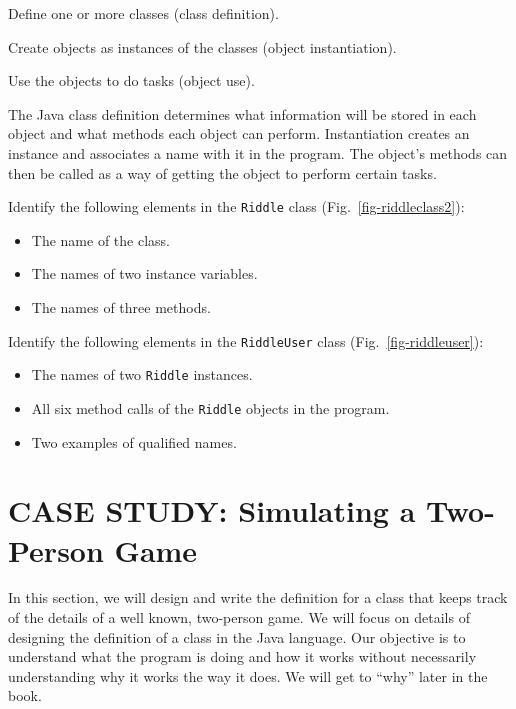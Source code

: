\begin{BL}
\item  Define one or more classes (class definition).
\item  Create objects as instances of the classes (object instantiation).
\item  Use the objects to do tasks (object use).
\end{BL}

\noindent The Java class definition determines what
information will be stored in each object and what methods each object
can perform.  Instantiation creates an instance and associates a name
with it in the program.  The object's methods can then be called as a
way of getting the object to perform certain tasks.

\pagebreak
{}
\begin{SSTUDY}

\item
Identify the following elements in the {\tt Riddle} class
(Fig.~\ref{fig-riddleclass2}):

\begin{itemize}
\item  The name of the class.
\item  The names of two instance variables.
\item  The names of three methods.
\end{itemize}


\item
Identify the following elements in the {\tt RiddleUser} class
(Fig.~\ref{fig-riddleuser}):

\begin{itemize}
\item  The names of two {\tt Riddle} instances.
\item  All six method calls of the {\tt Riddle} objects in the program.
\item  Two examples of qualified names.
\end{itemize}

\end{SSTUDY}


\section{CASE STUDY: Simulating a Two-Person Game}
\noindent In this section, we will design and write the definition
for a class that keeps track of the details of a well known, two-person
game. We will focus on details of designing the definition of a class
in the Java language.  Our objective is to understand what the program
is doing and how it works without necessarily understanding why it
works the way it does.  We will get to ``why'' later in the book.

